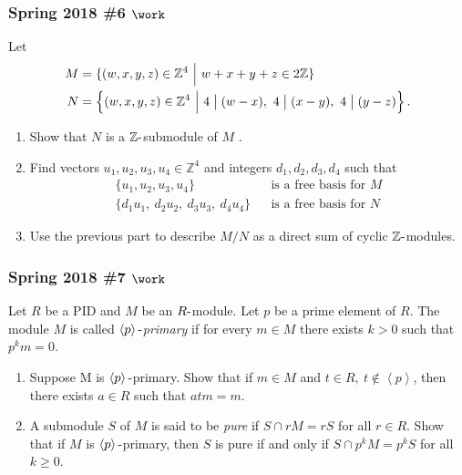 \hypertarget{spring-2018-6-work}{%
\subsubsection{\texorpdfstring{Spring 2018 \#6
\(\work\)}{Spring 2018 \#6 \textbackslash work}}\label{spring-2018-6-work}}

Let
\begin{align*}
M &= \{(w, x, y, z) \in {\mathbb{Z}}^4 {~\mathrel{\Big|}~}w + x + y + z \in 2{\mathbb{Z}}\} \\
N &= \left\{{
(w, x, y, z) \in {\mathbb{Z}}^4 {~\mathrel{\Big|}~}4\bigm|(w - x),~ 4\bigm|(x - y),~ 4\bigm|( y - z)
}\right\}
.\end{align*}

\begin{enumerate}
\def\labelenumi{\alph{enumi}.}
\item
  Show that \(N\) is a \({\mathbb{Z}}{\hbox{-}}\)submodule of \(M\) .
\item
  Find vectors \(u_1 , u_2 , u_3 , u_4 \in {\mathbb{Z}}^4\) and integers
  \(d_1 , d_2 , d_3 , d_4\) such that
  \begin{align*}
  \{
  u_1 , u_2 , u_3 , u_4 
  \} 
  && \text{is a free basis for }M
  \\
  \{
  d_1 u_1,~ d_2 u_2,~ d_3 u_3,~ d_4 u_4 
  \}
  && \text{is a free basis for }N
  \end{align*}
\item
  Use the previous part to describe \(M/N\) as a direct sum of cyclic
  \({\mathbb{Z}}{\hbox{-}}\)modules.
\end{enumerate}

\hypertarget{spring-2018-7-work}{%
\subsubsection{\texorpdfstring{Spring 2018 \#7
\(\work\)}{Spring 2018 \#7 \textbackslash work}}\label{spring-2018-7-work}}

Let \(R\) be a PID and \(M\) be an \(R{\hbox{-}}\)module. Let \(p\) be a
prime element of \(R\). The module \(M\) is called
\emph{\(\left\langle{p}\right\rangle{\hbox{-}}\)primary} if for every
\(m \in M\) there exists \(k > 0\) such that \(p^k m = 0\).

\begin{enumerate}
\def\labelenumi{\alph{enumi}.}
\item
  Suppose M is \(\left\langle{p}\right\rangle{\hbox{-}}\)primary. Show
  that if \(m \in M\) and
  \(t \in R, ~t \not\in \left\langle{p}\right\rangle\), then there
  exists \(a \in R\) such that \(atm = m\).
\item
  A submodule \(S\) of \(M\) is said to be \emph{pure} if
  \(S \cap r M = rS\) for all \(r \in R\). Show that if \(M\) is
  \(\left\langle{p}\right\rangle{\hbox{-}}\)primary, then \(S\) is pure
  if and only if \(S \cap p^k M = p^k S\) for all \(k \geq 0\).
\end{enumerate}

